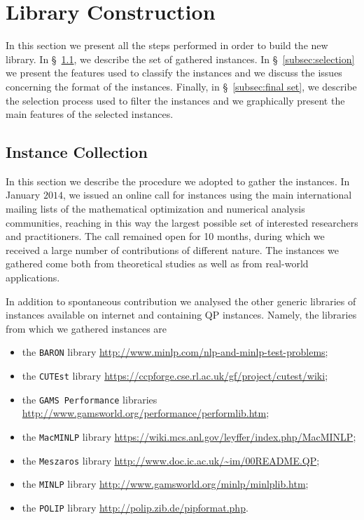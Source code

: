 \section{Library Construction}\label{sec:lib}

In this section we present all the steps performed in order to build the
new library. In \S~\ref{subsec:instColl}, we describe the set of gathered
instances. In \S~\ref{subsec:selection} we present the features used to
classify the instances and we discuss the issues concerning the format of
the instances. Finally, in \S~\ref{subsec:final set}, we describe the
selection process used to filter the instances and we graphically present
the main features of the selected instances.

\subsection{Instance Collection}\label{subsec:instColl}

In this section we describe the procedure we adopted to gather the
instances. In January $2014$, we issued an online call for instances
using the main international mailing lists of the mathematical
optimization and numerical analysis communities, reaching in this way
the largest possible set of interested researchers and practitioners.
The call remained open for 10 months, during which we received a large
number of contributions of different nature. The instances we gathered
come both from theoretical studies as well as from real-world
applications.

In addition to spontaneous contribution we analysed the other generic
libraries of instances available  on internet and containing QP
instances. Namely, the libraries from which we gathered instances are
%
\begin{itemize}
 \item the \texttt{BARON} library
 \url{http://www.minlp.com/nlp-and-minlp-test-problems};
%
\item the \texttt{CUTEst} library
 \url{https://ccpforge.cse.rl.ac.uk/gf/project/cutest/wiki};
%
\item the \texttt{GAMS Performance} libraries
 \url{http://www.gamsworld.org/performance/performlib.htm};
%
\item the \texttt{MacMINLP} library
 \url{https://wiki.mcs.anl.gov/leyffer/index.php/MacMINLP};
%
\item the \texttt{Meszaros} library
 \url{http://www.doc.ic.ac.uk/~im/00README.QP};
%
\item the \texttt{MINLP} library
 \url{http://www.gamsworld.org/minlp/minlplib.htm};
%
\item the \texttt{POLIP} library
 \url{http://polip.zib.de/pipformat.php}.
\end{itemize}

